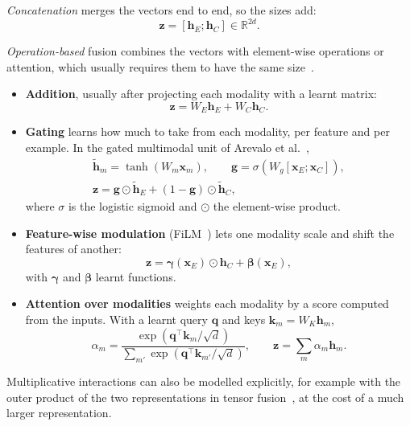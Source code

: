 \smallskip\noindent\emph{Concatenation} merges the vectors end to end, so the
sizes add:
\begin{equation}
  \mathbf{z} = [\mathbf{h}_{E}; \mathbf{h}_{C}] \in \mathbb{R}^{2d}.
\end{equation}

\smallskip\noindent\emph{Operation-based} fusion combines the vectors with
element-wise operations or attention, which usually requires them to have the
same size~\cite{krones2025review}.
\begin{itemize}
  \item \textbf{Addition}, usually after projecting each modality with a learnt
        matrix:
        \begin{equation}
          \mathbf{z} = W_{E}\mathbf{h}_{E} + W_{C}\mathbf{h}_{C}.
        \end{equation}
  \item \textbf{Gating} learns how much to take from each modality, per feature and
        per example. In the gated multimodal unit of Arevalo et
        al.~\cite{arevalo2017gated},
        \begin{equation}
          \begin{gathered}
            \tilde{\mathbf{h}}_m = \tanh(W_m \mathbf{x}_m), \qquad
            \mathbf{g} = \sigma\left(W_g [\mathbf{x}_{E}; \mathbf{x}_{C}]\right), \\
            \mathbf{z} = \mathbf{g} \odot \tilde{\mathbf{h}}_{E} + (1 - \mathbf{g}) \odot \tilde{\mathbf{h}}_{C},
          \end{gathered}
        \end{equation}
        where $\sigma$ is the logistic sigmoid and $\odot$ the element-wise product.
  \item \textbf{Feature-wise modulation} (FiLM~\cite{perez2018film}) lets one
        modality scale and shift the features of another:
        \begin{equation}
          \mathbf{z} = \symbf{\gamma}(\mathbf{x}_{E}) \odot \mathbf{h}_{C} + \symbf{\beta}(\mathbf{x}_{E}),
        \end{equation}
        with $\symbf{\gamma}$ and $\symbf{\beta}$ learnt functions.
  \item \textbf{Attention over modalities} weights each modality by a score computed
        from the inputs. With a learnt query $\mathbf{q}$ and keys
        $\mathbf{k}_m = W_K \mathbf{h}_m$,
        \begin{equation}
          \alpha_m = \frac{\exp\left(\mathbf{q}^\top \mathbf{k}_m / \sqrt{d}\right)}
                          {\sum_{m'} \exp\left(\mathbf{q}^\top \mathbf{k}_{m'} / \sqrt{d}\right)},
          \qquad
          \mathbf{z} = \sum_m \alpha_m \mathbf{h}_m.
        \end{equation}
\end{itemize}
Multiplicative interactions can also be modelled explicitly, for example with
the outer product of the two representations in tensor
fusion~\cite{zadeh2017tensor}, at the cost of a much larger representation.

